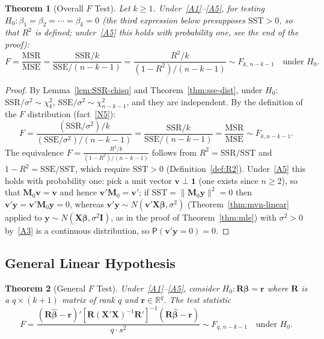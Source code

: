 \documentclass[14pt]{extarticle}
\theoremstyle{plain}
\newtheorem{theorem}{Theorem}[section]
\theoremstyle{definition}
\theoremstyle{remark}
\newcommand\prb{\mathsf{P}}
\newcommand{\SST}{\mathrm{SST}}
\newcommand{\SSR}{\mathrm{SSR}}
\newcommand{\SSE}{\mathrm{SSE}}
\newcommand{\MSR}{\mathrm{MSR}}
\newcommand{\MSE}{\mathrm{MSE}}
\newcommand{\bX}{\mathbf{X}}
\newcommand{\by}{\mathbf{y}}
\def\bb{\boldsymbol{\beta}}
\newcommand{\bI}{\mathbf{I}}
\newcommand{\bM}{\mathbf{M}}
\newcommand{\bR}{\mathbf{R}}
\newcommand{\br}{\mathbf{r}}
\newcommand{\bone}{\mathbf{1}}
\newcommand{\bv}{\mathbf{v}}
\newcommand{\Real}{\mathbb{R}}
\begin{document}
\begin{theorem}[Overall $F$ Test]\label{thm:f-test}
Let $k \geqslant 1$. Under~\ref{A1}--\ref{A5}, for testing $H_0\colon \beta_1 = \beta_2 = \cdots = \beta_k = 0$ (the third expression below presupposes $\SST > 0$, so that $R^2$ is defined; under~\ref{A5} this holds with probability one, see the end of the proof):
\begin{equation}\label{eq:f-test}
\boxed{F = \frac{\MSR}{\MSE} = \frac{\SSR/k}{\SSE/(n-k-1)} = \frac{R^2/k}{(1-R^2)/(n-k-1)} \sim F_{k,\,n-k-1} \quad \text{under } H_0.}
\end{equation}
\end{theorem}

\begin{proof}
By Lemma~\ref{lem:SSR-chisq} and Theorem~\ref{thm:sse-dist}, under $H_0$: $\SSR/\sigma^2 \sim \chi^2_k$, $\SSE/\sigma^2 \sim \chi^2_{n-k-1}$, and they are independent. By the definition of the $F$ distribution (fact~\ref{N5}):
\[
F = \frac{(\SSR/\sigma^2)/k}{(\SSE/\sigma^2)/(n-k-1)} = \frac{\SSR/k}{\SSE/(n-k-1)} = \frac{\MSR}{\MSE} \sim F_{k, n-k-1}.
\]
The equivalence $F = \frac{R^2/k}{(1-R^2)/(n-k-1)}$ follows from $R^2 = \SSR/\SST$ and $1 - R^2 = \SSE/\SST$, which require $\SST > 0$ (Definition~\ref{def:R2}). Under~\ref{A5} this holds with probability one: pick a unit vector $\bv \perp \bone$ (one exists since $n \geqslant 2$), so that $\bM_0\bv = \bv$ and hence $\bv'\bM_0 = \bv'$; if $\SST = \|\bM_0\by\|^2 = 0$ then $\bv'\by = \bv'\bM_0\by = 0$, whereas $\bv'\by \sim N(\bv'\bX\bb, \sigma^2)$ (Theorem~\ref{thm:mvn-linear} applied to $\by \sim N(\bX\bb, \sigma^2\bI)$, as in the proof of Theorem~\ref{thm:mle}) with $\sigma^2 > 0$ by~\ref{A3} is a continuous distribution, so $\prb(\bv'\by = 0) = 0$.
\end{proof}

\subsection{General Linear Hypothesis}

\begin{theorem}[General $F$ Test]\label{thm:general-F}
Under~\ref{A1}--\ref{A5}, consider $H_0\colon \bR\bb = \br$ where $\bR$ is a $q \times (k+1)$ matrix of rank $q$ and $\br \in \Real^q$. The test statistic
\begin{equation}\label{eq:general-F}
\boxed{F = \frac{(\bR\hat{\bb} - \br)'[\bR(\bX'\bX)^{-1}\bR']^{-1}(\bR\hat{\bb} - \br)}{q \cdot s^2} \sim F_{q,\, n-k-1} \quad \text{under } H_0.}
\end{equation}
\end{theorem}
\end{document}
